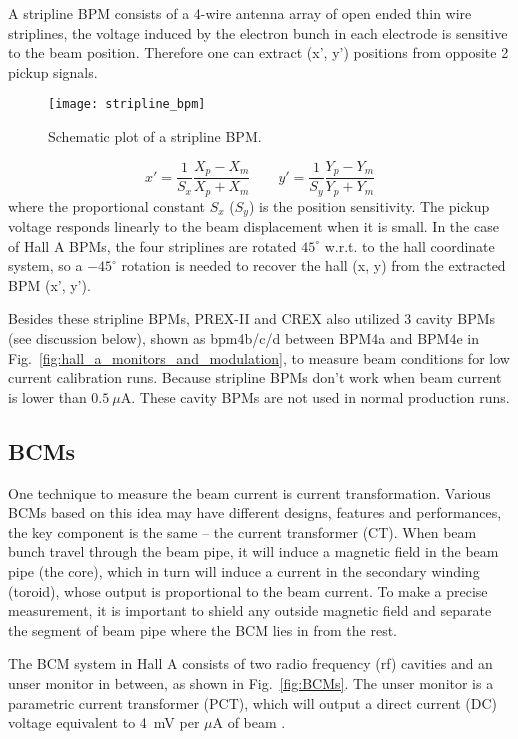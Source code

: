 A stripline BPM consists of a 4-wire antenna array of open ended thin wire striplines, 
the voltage induced by the electron bunch in each electrode is sensitive to the beam position.
Therefore one can extract (x', y') positions from opposite 2 pickup signals.
\begin{figure}[!h]
    \centering
    \texttt{[image: stripline\_bpm]}
    \caption{Schematic plot of a stripline BPM.}
\end{figure}
\begin{equation}
    x' = \frac{1}{S_x} \frac{X_p - X_m}{X_p + X_m}   \qquad
    y' = \frac{1}{S_y} \frac{Y_p - Y_m}{Y_p + Y_m}   
\end{equation}
where the proportional constant $S_x$ ($S_y$) is the position sensitivity. 
The pickup voltage responds linearly to the beam displacement when it
is small. In the case of Hall A BPMs, the four striplines are rotated $45^\circ$
w.r.t. to the hall coordinate system, so a $-45^\circ$ rotation is needed to recover
the hall (x, y) from the extracted BPM (x', y').

Besides these stripline BPMs, PREX-II and CREX also utilized 3 cavity BPMs (see discussion below),
shown as bpm4b/c/d between BPM4a and BPM4e in Fig.~\ref{fig:hall_a_monitors_and_modulation},
to measure beam conditions for low current calibration runs. Because stripline
BPMs don't work when beam current is lower than $0.5\ \mu$A. These cavity
BPMs are not used in normal production runs.

\subsection{BCMs}
One technique to measure the beam current is current transformation.
Various BCMs based on this idea may have different designs, features and performances, 
the key component is the same -- the current transformer (CT). When beam bunch 
travel through the beam pipe, it will induce a magnetic field in the beam pipe (the core), 
which in turn will induce a current in the secondary winding (toroid), 
whose output is proportional to the beam current. 
To make a precise measurement, it is important to shield any outside magnetic 
field and separate the segment of beam pipe where the BCM lies in from the rest.

The BCM system in Hall A consists of two radio frequency (rf) cavities and
an unser monitor in between, as shown in Fig.~\ref{fig:BCMs}. 
The unser monitor is a parametric current transformer (PCT),
which will output a direct current (DC) voltage equivalent to 4~mV per $\mu$A of beam \cite{987367}.


